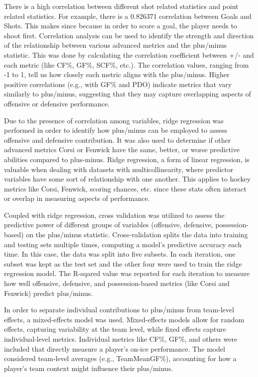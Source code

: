 \documentclass[12pt]{article}
\begin{document}
There is a high correlation between different shot related statistics and point related statistics. For example, there is a 
0.826371 correlation between Goals and Shots. This makes since because in order to score a goal, the player needs to shoot first.
Correlation analysis can be used to identify the strength and direction of the relationship between various advanced metrics and 
the plus/minus statistic. This was done by calculating the correlation coefficient between +/- and each metric (like CF\%, GF\%, SCF\%, etc.).
The correlation values, ranging from -1 to 1, tell us how closely each metric aligns with the plus/minus. Higher positive correlations 
(e.g., with GF\% and PDO) indicate metrics that vary similarly to plus/minus, suggesting that they may capture overlapping aspects of 
offensive or defensive performance.

Due to the presence of correlation among variables, ridge regression was performed in order to identify how plus/minus can be employed 
to assess offensive and defensive contribution. It was also used to determine if other advanced metrics Corsi or Fenwick have the same, 
better, or worse predictive abilities compared to plus-minus. Ridge regression, a form of linear regression, is valuable when dealing 
with datasets with multicollinearity, where predictor variables have some sort of relationship with one another. This applies to hockey metrics 
like Corsi, Fenwick, scoring chances, etc. since these stats often interact or overlap in measuring aspects of performance.

Coupled with ridge regression, cross validation was utilized to assess the predictive power of different groups of variables (offensive, 
defensive, possession-based) on the plus/minus statistic. Cross-validation splits the data into training and testing sets multiple times, 
computing a model's predictive accuracy each time. In this case, the data was split into five subsets. In each iteration, one subset was
kept as the test set and the other four were used to train the ridge regression model. The R-sqared value was reported for each iteration
to measure how well offensive, defensive, and possession-based metrics (like Corsi and Fenwick) predict plus/minus.

In order to separate individual contributions to plus/minus from team-level effects, a mixed-effects model was used. Mixed-effects models 
allow for random effects, capturing variability at the team level, while fixed effects capture individual-level metrics. Individual metrics 
like CF\%, GF\%, and others were included that directly measure a player's on-ice performance. The model considered team-level averages 
(e.g., TeamMeanGF\%), accounting for how a player’s team context might influence their plus/minus.
\end{document}
